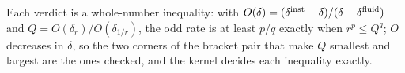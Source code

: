 \documentclass[11pt]{article}
\begin{document}
Each verdict is a whole-number inequality: with $O(\delta)=(\delta^{\rm inst}-\delta)/(\delta-\delta^{\rm fluid})$ and $Q=O(\delta_r)/O(\delta_{1/r})$, the odd rate is at least $p/q$ exactly when $r^p\le Q^q$; $O$ decreases in $\delta$, so the two corners of the bracket pair that make $Q$ smallest and largest are the ones checked, and the kernel decides each inequality exactly.
\end{document}

